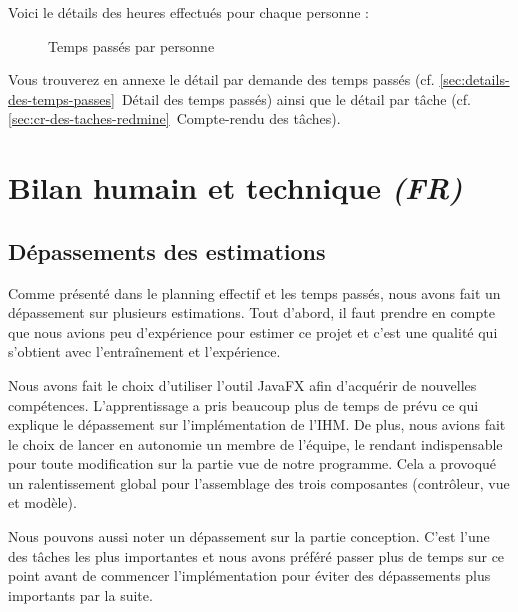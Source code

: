 \documentclass[paper=a4,fontsize=11pt]{report}
\numberwithin{equation}{section}		%
\numberwithin{figure}{section}		%
\numberwithin{table}{section}		%
\renewcommand{\it}[1]{\textit{#1}}
\begin{document}
Voici le détails des heures effectués pour chaque personne :

\begin{figure}[H]
\centering
{}
\caption{Temps passés par personne}
\end{figure}

Vous trouverez en annexe le détail par demande des temps passés (cf. \ref{sec:details-des-temps-passes}~Détail des temps passés) ainsi que le détail par tâche (cf. \ref{sec:cr-des-taches-redmine}~Compte-rendu des tâches).

\section{Bilan humain et technique \it{(FR)}}
\label{sec:bilan-humain-et-technique}

\subsection{Dépassements des estimations}
\label{subsec:depassements-des-estimations}

Comme présenté dans le planning effectif et les temps passés, nous avons fait un dépassement sur plusieurs estimations. Tout d'abord, il faut prendre en compte que nous avions peu d'expérience pour estimer ce projet et c'est une qualité qui s'obtient avec l’entraînement et l'expérience.

Nous avons fait le choix d'utiliser l'outil JavaFX afin d'acquérir de nouvelles compétences. L'apprentissage a pris beaucoup plus de temps de prévu ce qui explique le dépassement sur l'implémentation de l'IHM. De plus, nous avions fait le choix de lancer en autonomie un membre de l'équipe, le rendant indispensable pour toute modification sur la partie vue de notre programme. Cela a provoqué un ralentissement global pour l'assemblage des trois composantes (contrôleur, vue et modèle).

Nous pouvons aussi noter un dépassement sur la partie conception. C'est l'une des tâches les plus importantes et nous avons préféré passer plus de temps sur ce point avant de commencer l'implémentation pour éviter des dépassements plus importants par la suite.
\end{document}
